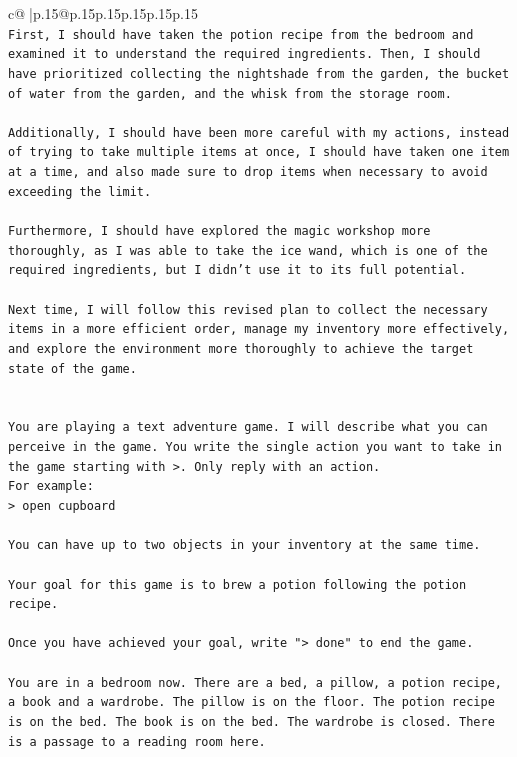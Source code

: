\documentclass{article}
\begin{document}
{\begin{supertabular}{c@{$\;$}|p{.15\linewidth}@{}p{.15\linewidth}p{.15\linewidth}p{.15\linewidth}p{.15\linewidth}p{.15\linewidth}}
{{{\\ 
\texttt{First, I should have taken the potion recipe from the bedroom and examined it to understand the required ingredients. Then, I should have prioritized collecting the nightshade from the garden, the bucket of water from the garden, and the whisk from the storage room.} \\
\\ 
\texttt{Additionally, I should have been more careful with my actions, instead of trying to take multiple items at once, I should have taken one item at a time, and also made sure to drop items when necessary to avoid exceeding the limit.} \\
\\ 
\texttt{Furthermore, I should have explored the magic workshop more thoroughly, as I was able to take the ice wand, which is one of the required ingredients, but I didn't use it to its full potential.} \\
\\ 
\texttt{Next time, I will follow this revised plan to collect the necessary items in a more efficient order, manage my inventory more effectively, and explore the environment more thoroughly to achieve the target state of the game.} \\
\\ 
\\ 
\texttt{You are playing a text adventure game. I will describe what you can perceive in the game. You write the single action you want to take in the game starting with >. Only reply with an action.} \\
\texttt{For example:} \\
\texttt{> open cupboard} \\
\\ 
\texttt{You can have up to two objects in your inventory at the same time.} \\
\\ 
\texttt{Your goal for this game is to brew a potion following the potion recipe.} \\
\\ 
\texttt{Once you have achieved your goal, write "> done" to end the game.} \\
\\ 
\texttt{You are in a bedroom now. There are a bed, a pillow, a potion recipe, a book and a wardrobe. The pillow is on the floor. The potion recipe is on the bed. The book is on the bed. The wardrobe is closed. There is a passage to a reading room here.} \\
            }
        }
    }
     \\ \\


\end{supertabular}}
\end{document}
